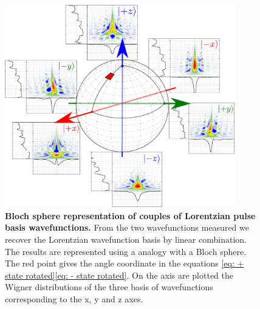 \begin{figure}[hpbt]
	\centering
	\includegraphics[width = 10cm]{./chap1/dessin_bloch_sphere_data_51mK_v3}
	\caption{\textbf{Bloch sphere representation of couples of Lorentzian pulse basis wavefunctions.} From the two wavefunctions measured we recover the Lorentzian wavefunction basis by linear combination. The results are represented using a analogy with a Bloch sphere. The red point gives the angle coordinate in the equations \eqref{eq: + state rotated}\eqref{eq: - state rotated}. On the axis are plotted the Wigner distributions of the three basis of wavefunctions corresponding to the x, y and z axes.  %
	}
	\label{fig: la sphere de bloch de q=2e}
\end{figure}

